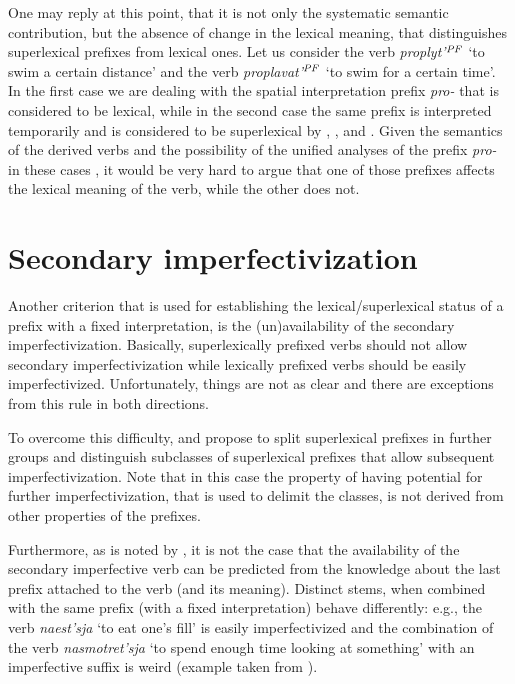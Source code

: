 One may reply at this point, that it is not only the systematic semantic contribution, but the absence of change in the lexical meaning, that distinguishes superlexical prefixes from lexical ones. Let us consider the verb \textit{proplyt'}$^{\mathit{PF}}$ `to swim a certain distance' and the verb \textit{proplavat'}$^{\mathit{PF}}$ `to swim for a certain time'. In the first case we are dealing with the spatial interpretation prefix \textit{pro-} that is considered to be lexical, while in the second case the same prefix is interpreted temporarily and is considered to be superlexical by \citet{Babko-Malaya:99}, \citet{Svenonius:04a}, and \citet{Svenonius:12}. Given the semantics of the derived verbs and the possibility of the unified analyses of the prefix \textit{pro-} in these cases \citep{Kagan:book, ZinovaOsswald:paper}, it would be very hard to argue that one of those prefixes affects the lexical meaning of the verb, while the other does not. 

\section{Secondary imperfectivization}\label{section:new:imperfectivization}
Another criterion that is used for establishing the lexical/superlexical status of a prefix with a fixed interpretation, is the (un)availability of the secondary imperfectivization. Basically, superlexically prefixed verbs should not allow secondary imperfectivization while lexically prefixed verbs should be easily imperfectivized. Unfortunately, things are not as clear and there are exceptions from this rule in both directions. 

To overcome this difficulty, \citet{Svenonius:04b} and \citet{Tatevosov:07, Tatevosov:09} propose to split superlexical prefixes in further groups and distinguish subclasses of superlexical prefixes that allow subsequent imperfectivization. Note that in this case the property of having potential for further imperfectivization, that is used to delimit the classes, is not derived from other properties of the prefixes.

Furthermore, as is noted by \citet[35]{Kagan:book}, it is not the case that the availability of the secondary imperfective verb can be predicted from the knowledge about the last prefix attached to the verb (and its meaning). Distinct stems, when combined with the same prefix (with a fixed interpretation) behave differently: e.g., the verb \textit{naest’sja} `to eat one's fill' is easily imperfectivized and the combination of the verb \textit{nasmotret'sja} `to spend enough time looking at something' with an imperfective suffix is weird (example taken from \citealt[35]{Kagan:book}).

